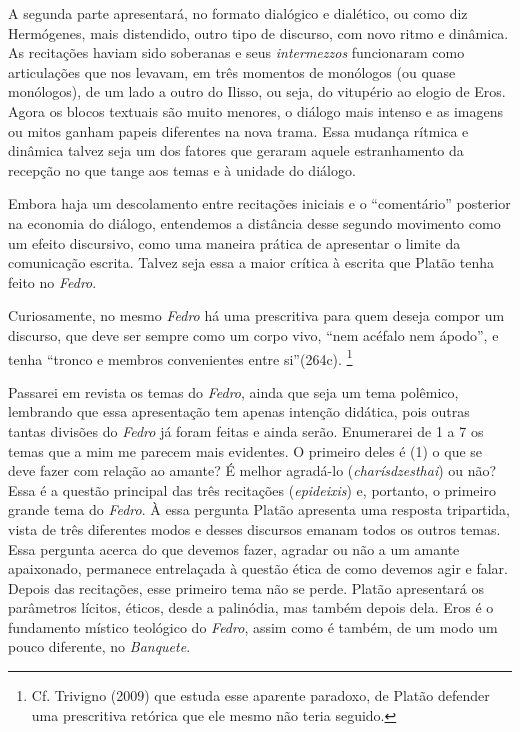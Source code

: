 A segunda parte apresentará, no formato dialógico e dialético, ou como
diz Hermógenes, mais distendido, outro tipo de discurso, com novo ritmo
e dinâmica. As recitações haviam sido soberanas e seus
\emph{intermezzos} funcionaram como articulações que nos levavam, em
três momentos de monólogos (ou quase monólogos), de um lado a outro do
Ilisso, ou seja, do vitupério ao elogio de Eros. Agora os blocos
textuais são muito menores, o diálogo mais intenso e as imagens ou mitos
ganham papeis diferentes na nova trama. Essa mudança rítmica e dinâmica
talvez seja um dos fatores que geraram aquele estranhamento da recepção
no que tange aos temas e à unidade do diálogo.

Embora haja um descolamento entre recitações iniciais e o ``comentário''
posterior na economia do diálogo, entendemos a distância desse segundo
movimento como um efeito discursivo, como uma maneira prática de
apresentar o limite da comunicação escrita. Talvez seja essa a maior
crítica à escrita que Platão tenha feito no \emph{Fedro}.

Curiosamente, no mesmo \emph{Fedro} há uma prescritiva para quem deseja
compor um discurso, que deve ser sempre como um corpo vivo, ``nem
acéfalo nem ápodo'', e tenha ``tronco e membros convenientes entre
si''(264c). \footnote{Cf. Trivigno (2009) que estuda esse aparente
  paradoxo, de Platão defender uma prescritiva retórica que ele mesmo
  não teria seguido.}

Passarei em revista os temas do \emph{Fedro}, ainda que seja um tema
polêmico, lembrando que essa apresentação tem apenas intenção didática,
pois outras tantas divisões do \emph{Fedro} já foram feitas e ainda
serão. Enumerarei de 1 a 7 os temas que a mim me parecem mais evidentes.
O primeiro deles é (1) o que se deve fazer com relação ao amante? É
melhor agradá-lo (\emph{charísdzesthai}) ou não? Essa é a questão
principal das três recitações (\emph{epideixis}) e, portanto, o primeiro
grande tema do \emph{Fedro}. À essa pergunta Platão apresenta uma
resposta tripartida, vista de três diferentes modos e desses discursos
emanam todos os outros temas. Essa pergunta acerca do que devemos fazer,
agradar ou não a um amante apaixonado, permanece entrelaçada à questão
ética de como devemos agir e falar. Depois das recitações, esse primeiro
tema não se perde. Platão apresentará os parâmetros lícitos, éticos,
desde a palinódia, mas também depois dela. Eros é o fundamento místico
teológico do \emph{Fedro}, assim como é também, de um modo um pouco
diferente, no \emph{Banquete}.

